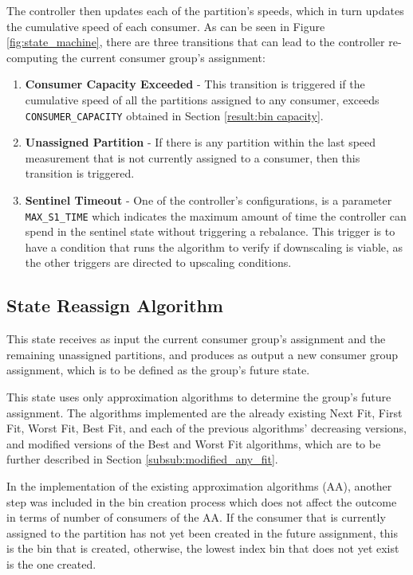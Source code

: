 The controller then updates each of the partition's speeds, which in turn
updates the cumulative speed of each consumer. As can be seen in Figure
\ref{fig:state_machine}, there are three transitions that can lead to the
controller re-computing the current consumer group's assignment:
\begin{enumerate} 
    \item \textbf{Consumer Capacity Exceeded} - This transition is triggered if
        the cumulative speed of all the partitions assigned to any consumer,
        exceeds \lstinline{CONSUMER_CAPACITY} obtained in Section
        \ref{result:bin capacity}.  
    \item \textbf{Unassigned Partition} - If there is any partition within the
        last speed measurement that is not currently assigned to a consumer,
        then this transition is triggered.  
    \item \textbf{Sentinel Timeout} - One of the controller's configurations, is
        a parameter \lstinline{MAX_S1_TIME} which indicates the
        maximum amount of time the controller can spend in the sentinel state
        without triggering a rebalance. This trigger is to have a condition that
        runs the algorithm to verify if downscaling is viable, as the other
        triggers are directed to upscaling conditions.
\end{enumerate}

\subsection{State Reassign Algorithm}
\label{sub:reassign}

This state receives as input the current consumer group's assignment and the
remaining unassigned partitions, and produces as output a new consumer group
assignment, which is to be defined as the group's future state.

This state uses only approximation algorithms to determine the group's future
assignment. The algorithms implemented are the already existing Next Fit, First
Fit, Worst Fit, Best Fit, and each of the previous algorithms' decreasing
versions, and modified versions of the Best and Worst Fit algorithms, which are
to be further described in Section \ref{subsub:modified_any_fit}. 

In the implementation of the existing approximation algorithms (AA), another step was
included in the bin creation process which does not affect the outcome in terms
of number of consumers of the AA. If the consumer that is currently assigned to
the partition has not yet been created in the future assignment, this is the bin
that is created, otherwise, the lowest index bin that does not yet exist is the
one created.

